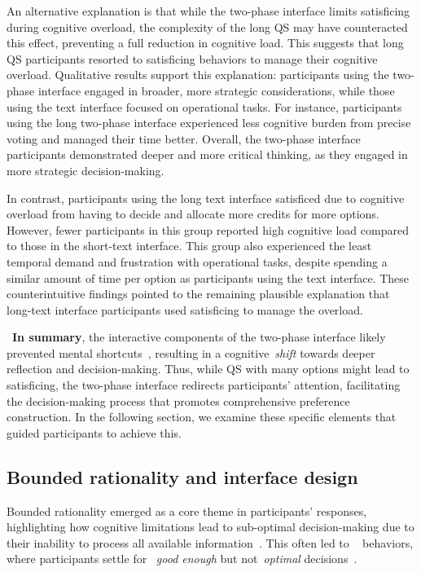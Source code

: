 An alternative explanation is that while the two-phase interface limits satisficing during cognitive overload, the complexity of the long QS may have counteracted this effect, preventing a full reduction in cognitive load. This suggests that long QS participants resorted to satisficing behaviors to manage their cognitive overload. Qualitative results support this explanation: participants using the two-phase interface engaged in broader, more strategic considerations, while those using the text interface focused on operational tasks. For instance, participants using the long two-phase interface experienced less cognitive burden from precise voting and managed their time better. Overall, the two-phase interface participants demonstrated deeper and more critical thinking, as they engaged in more strategic decision-making.

In contrast, participants using the long text interface satisficed due to cognitive overload from having to decide and allocate more credits for more options. However, fewer participants in this group reported high cognitive load compared to those in the short-text interface. This group also experienced the least temporal demand and frustration with operational tasks, despite spending a similar amount of time per option as participants using the text interface. These counterintuitive findings pointed to the remaining plausible explanation that long-text interface participants used satisficing to manage the overload.

~\textbf{In summary}, the interactive components of the two-phase interface likely prevented mental shortcuts~\cite{daniel2017thinking, simonBehavioralModelRational1955, payneAdaptiveStrategySelection1988, tverskyJudgmentsRepresentativeness}, resulting in a cognitive~\textit{shift} towards deeper reflection and decision-making. Thus, while QS with many options might lead to satisficing, the two-phase interface redirects participants' attention, facilitating the decision-making process that promotes comprehensive preference construction. In the following section, we examine these specific elements that guided participants to achieve this.

\subsection{Bounded rationality and interface design}
Bounded rationality emerged as a core theme in participants' responses, highlighting how cognitive limitations lead to sub-optimal decision-making due to their inability to process all available information~\cite{simonBehavioralModelRational1955}. This often led to ~\textit{} behaviors, where participants settle for ~\textit{good enough} but not~\textit{optimal} decisions~\cite{gigerenzerReasoningFastFrugal1996}.

